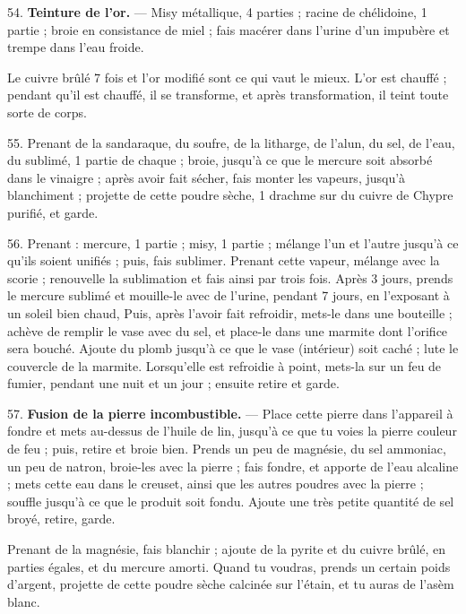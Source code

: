 \documentclass[a4paper, 11pt, oneside, polutonikogreek, french]{article}
\begin{document}
54. \textbf{Teinture de l'or.} --- Misy métallique, 4 parties ; racine de chélidoine, 1 partie ; broie en consistance de miel ; fais macérer dans l'urine d'un impubère et trempe dans l'eau froide.

Le cuivre brûlé 7 fois et l'or modifié sont ce qui vaut le mieux. L'or est chauffé ; pendant qu'il est chauffé, il se transforme, et après transformation, il teint toute sorte de corps.

55. Prenant de la sandaraque, du soufre, de la litharge, de l'alun, du sel, de l'eau, du sublimé, 1 partie de chaque ; broie, jusqu'à ce que le mercure soit absorbé dans le vinaigre ; après avoir fait sécher, fais monter les vapeurs, jusqu'à blanchiment ; projette de cette poudre sèche, 1 drachme sur du cuivre de Chypre purifié, et garde.

56. Prenant : mercure, 1 partie ; misy, 1 partie ; mélange l'un et l'autre jusqu'à ce qu'ils soient unifiés ; puis, fais sublimer. Prenant cette vapeur, mélange avec la scorie ; renouvelle la sublimation et fais ainsi par trois fois. Après 3 jours, prends le mercure sublimé et mouille-le avec de l'urine, pendant 7 jours, en l'exposant à un soleil bien chaud, Puis, après l'avoir fait refroidir, mets-le dans une bouteille ; achève de remplir le vase avec du sel, et place-le dans une marmite dont l'orifice sera bouché. Ajoute du plomb jusqu'à ce que le vase (intérieur) soit caché ; lute le couvercle de la marmite. Lorsqu'elle est refroidie à point, mets-la sur un feu de fumier, pendant une nuit et un jour ; ensuite retire et garde.

57. \textbf{Fusion de la pierre incombustible.} --- Place cette pierre dans l'appareil à fondre et mets au-dessus de l'huile de lin, jusqu'à ce que tu voies la pierre couleur de feu ; puis, retire et broie bien. Prends un peu de magnésie, du sel ammoniac, un peu de natron, broie-les avec la pierre ; fais fondre, et apporte de l'eau alcaline ; mets cette eau dans le creuset, ainsi que les autres poudres avec la pierre ; souffle jusqu'à ce que le produit soit fondu. Ajoute une très petite quantité de sel broyé, retire, garde.

Prenant de la magnésie, fais blanchir ; ajoute de la pyrite et du cuivre brûlé, en parties égales, et du mercure amorti. Quand tu voudras, prends un certain poids d'argent, projette de cette poudre sèche calcinée sur l'étain, et tu auras de l'asèm blanc.
\end{document}
